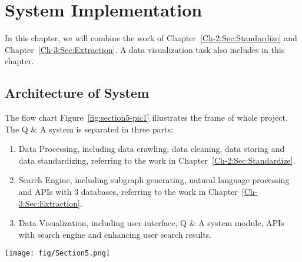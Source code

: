 \chapter{System Implementation}
\label{Ch-5:Sec:System}

In this chapter, we will combine the work of Chapter~\ref{Ch-2:Sec:Standardize} and Chapter~\ref{Ch-3:Sec:Extraction}. A data visualization task also includes in this chapter. 

\section{Architecture of System}
\vspace{-5pt}
The flow chart Figure~\ref{fig:section5-pic1} illustrates the frame of whole project. The Q \& A system is separated in three parts:
\begin{enumerate}
	\item Data Processing, including data crawling, data cleaning, data storing and data standardizing, referring to the work in Chapter~\ref{Ch-2:Sec:Standardize}.
	\item Search Engine, including subgraph generating, natural language processing and APIs with 3 databases, referring to the work in Chapter~\ref{Ch-3:Sec:Extraction}.
	\item Data Visualization, including user interface, Q \& A system module, APIs with search engine and enhancing user search results.
\end{enumerate}
\vspace{-10pt}
\begin{figure*}[!tbp]
\centering
\vspace{10pt}
\texttt{[image: fig/Section5.png]}
\vspace{10pt}
\caption{The Structure of System Implementation}
\label{fig:section5-pic1}
\vspace{20pt}
\end{figure*}

